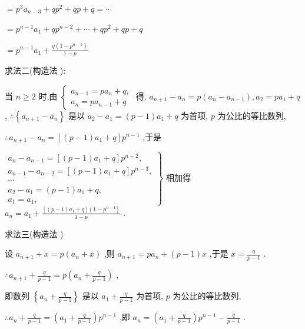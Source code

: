$= {p}^{3}{a}_{n - 3} + q{p}^{2} + {qp} + q = \cdots$

$= {p}^{n - 1}{a}_{1} + q{p}^{n - 2} + \cdots  + q{p}^{2} + {qp} + q$

$= {p}^{n - 1}{a}_{1} + \frac{q\left( {1 - {p}^{n - 1}}\right) }{1 - p}$

求法二(构造法  ):

当 $n \geq  2$ 时,由 $\left\{  \begin{array}{l} {a}_{n - 1} = p{a}_{n} + q, \\  {a}_{n} = p{a}_{n - 1} + q \end{array}\right.$ 得, ${a}_{n + 1} - {a}_{n} = p\left( {{a}_{n} - {a}_{n - 1}}\right) ,{a}_{2} = p{a}_{1} + q$ , $\therefore \left\{  {{a}_{n + 1} - {a}_{n}}\right\}$ 是以 ${a}_{2} - {a}_{1} = \left( {p - 1}\right) {a}_{1} + q$ 为首项, $p$ 为公比的等比数列,

$\therefore {a}_{n + 1} - {a}_{n} = \left\lbrack  {\left( {p - 1}\right) {a}_{1} + q}\right\rbrack  {p}^{n - 1}$ ,于是

$\left. \begin{array}{l} {a}_{n} - {a}_{n - 1} = \left\lbrack  {\left( {p - 1}\right) {a}_{1} + q}\right\rbrack  {p}^{n - 2}, \\  {a}_{n - 1} - {a}_{n - 2} = \left\lbrack  {\left( {p - 1}\right) {a}_{1} + q}\right\rbrack  {p}^{n - 3}, \\  \cdots \\  {a}_{2} - {a}_{1} = \left( {p - 1}\right) {a}_{1} + q, \\  {a}_{1} = {a}_{1}, \end{array}\right\}$ 相加得 ${a}_{n} = {a}_{1} + \frac{\left\lbrack  {\left( {p - 1}\right) {a}_{1} + q}\right\rbrack  \left( {1 - {p}^{n - 1}}\right\rbrack  }{1 - p}$ .

求法三(构造法  )

设 ${a}_{n + 1} + x = p\left( {{a}_{n} + x}\right)$ ,则 ${a}_{n + 1} = p{a}_{n} + \left( {p - 1}\right) x$ ,于是 $x = \frac{q}{p - 1}$ .

$\therefore {a}_{n + 1} + \frac{q}{p - 1} = p\left( {{a}_{n} + \frac{q}{p - 1}}\right)$ ,

即数列 $\left\{  {{a}_{n} + \frac{q}{p - 1}}\right\}$ 是以 ${a}_{1} + \frac{q}{p - 1}$ 为首项, $p$ 为公比的等比数列,

$\therefore {a}_{n} + \frac{q}{p - 1} = \left( {{a}_{1} + \frac{q}{p - 1}}\right) {p}^{n - 1}$ ,即 ${a}_{n} = \left( {{a}_{1} + \frac{q}{p - 1}}\right) {p}^{n - 1} - \frac{q}{p - 1}$ .


